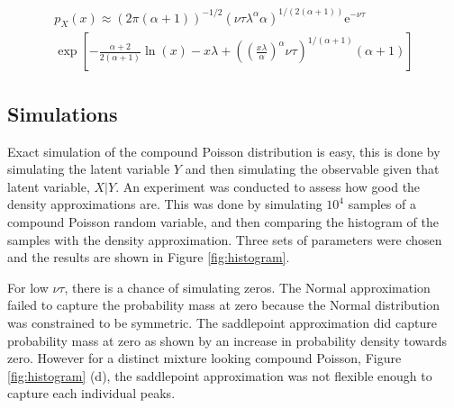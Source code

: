 \documentclass[a4paper]{proc}
\newcommand{\euler}{\mathrm{e}}
\begin{document}
\begin{figure*}[htb]
\begin{multline}
p_X(x)\approx
\left(2\pi(\alpha+1)\right)^{-1/2}\left(\nu\tau\lambda^\alpha\alpha\right)^{1/(2(\alpha+1))}\euler^{-\nu\tau}
\\
\exp\left[
-\frac{\alpha+2}{2(\alpha+1)}\ln(x)-x\lambda+\left(\left(\frac{x\lambda}{\alpha}\right)^{\alpha}\nu\tau\right)^{1/(\alpha+1)}(\alpha+1)
\right]
\label{eq:saddle_point_approx}
\end{multline}
\end{figure*}

\subsection{Simulations}
Exact simulation of the compound Poisson distribution is easy, this is done by simulating the latent variable $Y$ and then simulating the observable given that latent variable, $X|Y$. An experiment was conducted to assess how good the density approximations are. This was done by simulating $10^4$ samples of a compound Poisson random variable, and then comparing the histogram of the samples with the density approximation. Three sets of parameters were chosen and the results are shown in Figure \ref{fig:histogram}.

For low $\nu\tau$, there is a chance of simulating zeros. The Normal approximation failed to capture the probability mass at zero because the Normal distribution was constrained to be symmetric. The saddlepoint approximation did capture probability mass at zero as shown by an increase in probability density towards zero. However for a distinct mixture looking compound Poisson, Figure \ref{fig:histogram} (d), the saddlepoint approximation was not flexible enough to capture each individual peaks.
\end{document}
